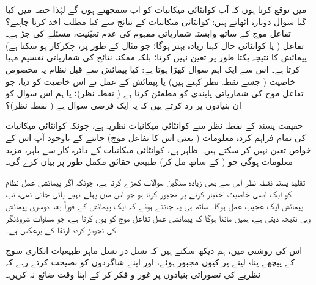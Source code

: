 
 میں توقع کرتا ہوں کہ آپ کوانٹائی میکانیات کو اب سمجھتے ہوں گے لہٰذا حصہ  میں کیا گیا سوال دوبارہ اٹھاتے ہیں: کوانٹائی میکانیات کے نتائج سے کیا مطلب اخذ کرنا چاہیے؟ تفاعل موج کے ساتھ وابستہ شماریاتی مفہوم کی عدم تعیّنیت، مسئلے کی جڑ ہے۔ تفاعل ( یا کوانٹائی حال کہنا زیادہ بہتر ہوگا؛ جو مثال کے طور پر، چکرکار ہو سکتا ہے) پیمائش کا نتیجہ یکتا طور پر تعین نہیں کرتا؛ بلکہ ممکنہ نتائج کی شماریاتی تقسیم مہیا کرتا ہے۔ اس سے ایک اہم سوال کھڑا ہوتا ہے: کیا پیمائش سے قبل نظام یہ مخصوص خاصیت  ( جسے  نقطہ نظر کہتے ہیں) یا پیمائش کے عمل نے اس خاصیت کو  دیا، جو تفاعل موج کی شماریاتی پابندی کو مطمئن کرتا ہے ( نقطہ نظر)؛ یا ہم اس سوال کو ان بنیادوں پر رد کرتے ہیں کہ یہ ایک فرضی سوال ہے ( نقطہ نظر)؟

حقیقت پسند کے نقطہ نظر سے کوانٹائی میکانیات  نظریہ ہے، چونکہ کوانٹائی میکانیات کی تمام فراہم کردہ معلومات ( یعنی اس کا تفاعل موج) جانتے کے باوجود آپ اس کے خواص تعین نہیں کر سکتے ہیں۔ ظاہر ہے، کوانٹائی میکانیات کے دائرہ کار سے باہر، مزید معلومات ہوگی جو ( کے ساتھ مل کر) طبیعی حقائق مکمل طور پر بیان کرے گی۔

تقلید پسند نقطہ نظر اس سے بھی زیادہ سنگین سوالات کھڑے کرتا ہے، چونکہ اگر پیمائشی عمل نظام کو ایک ایسی خاصیت اختیار کرنے پر مجبور کرتا ہو جو اس میں پہلے نہیں پائی جاتی تھی، تب پیمائش ایک عجیب عمل ہوگا۔ ساتھ ہی یہ جانتے ہوئے کہ ایک پیمائش کے فوراً بعد دوسری پیمائش وہی نتیجہ دیتی ہے، ہمیں ماننا ہوگا کہ پیمائشی عمل تفاعل موج کو یوں کرتا ہے، جو مساوات شروڈنگر کی تجویز کردہ ارتقا کے برعکس ہے۔ 

اس کی روشنی میں، ہم دیکھ سکتے ہیں کہ نسل در نسل ماہر طبیعیات انکاری سوچ کے پیچھے پناہ لینے پر کیوں مجبور ہوئے، اور اپنے شاگردوں کو نصیحت کرتے رہے کہ نظریے کی تصوراتی بنیادوں پر غور و فکر کر کے اپنا وقت ضائع نہ کریں۔

